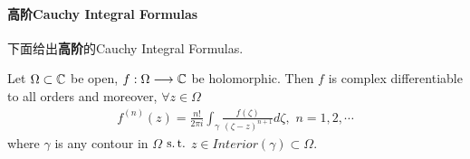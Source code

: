 \paragraph{高阶Cauchy Integral Formulas}
	下面给出\textbf{高阶}的Cauchy Integral Formulas.
	\begin{thm}\label{thm 5.2.2}
		Let $\Omega \subset \mathbb{C}$ be open, $f : \Omega \longrightarrow \mathbb{C}$ be holomorphic. Then $f$ is complex differentiable to all orders and moreover, $\forall z \in \Omega$
		\begin{align}
			f^{(n)}(z) = \frac{n!}{2 \pi i} \int_{\gamma}{\frac{f(\zeta)}{(\zeta - z)^{n + 1}} d\zeta} , \,\, n = 1 , 2 , \cdots
		\end{align}
		where $\gamma$ is any contour in $\Omega$ $\operatorname{s.t.}$ $z \in Interior(\gamma) \subset \Omega$.
	\end{thm}
	



\newpage
